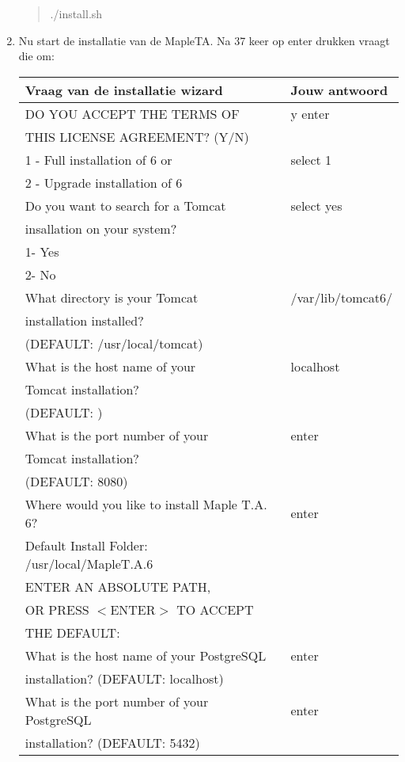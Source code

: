 \begin{enumerate}
\begin{quote}
					./install.sh 
			\end{quote}
		\item	Nu start de installatie van de MapleTA. Na 37 keer op enter drukken vraagt die om:
		
			\begin{tabular}{ | l | l |}
			  \hline
				Vraag van de installatie wizard & Jouw antwoord\\
				\hline
				DO YOU ACCEPT THE TERMS OF & y enter\\
				THIS LICENSE AGREEMENT? (Y/N) & \\
				\hline
				1 - Full installation of 6 or & select 1\\
				2 - Upgrade installation of 6 & \\
				\hline
				Do you want to search for a Tomcat & select yes\\
				insallation on your system? & \\
				1- Yes & \\
				2- No & \\
				\hline
				What directory is your Tomcat & /var/lib/tomcat6/\\
				installation installed? & \\
				(DEFAULT: /usr/local/tomcat) & \\
				\hline
				What is the host name of your & localhost\\
				Tomcat installation? & \\
				(DEFAULT: ) & \\ 
				\hline
				What is the port number of your  & enter\\ 
				Tomcat installation? & \\ 
				(DEFAULT: 8080) & \\ 
				\hline
				Where would you like to install Maple T.A. 6? & enter\\ 
				Default Install Folder: /usr/local/MapleT.A.6 & \\ 
				ENTER AN ABSOLUTE PATH, & \\ 
				OR PRESS $<$ENTER$>$ TO ACCEPT & \\
				THE DEFAULT: & \\
				\hline
				What is the host name of your PostgreSQL & enter\\ 
				installation?  \quad  (DEFAULT: localhost) & \\ 
				\hline
				 What is the port number of your PostgreSQL & enter\\
				 installation?  \quad  (DEFAULT: 5432)& \\

\end{tabular}
\end{enumerate}
